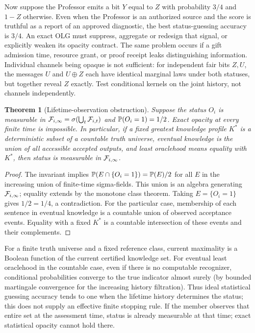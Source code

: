 \documentclass[11pt]{article}
\newtheorem{theorem}{Theorem}[section]\newtheorem{proposition}[theorem]{Proposition}\newtheorem{lemma}[theorem]{Lemma}\newtheorem{corollary}[theorem]{Corollary}
\theoremstyle{definition}\newtheorem{definition}[theorem]{Definition}\newtheorem{conjecture}[theorem]{Conjecture}\newtheorem{example}[theorem]{Example}
\begin{document}
Now suppose the Professor emits a bit $Y$ equal to $Z$ with probability $3/4$ and $1-Z$ otherwise. Even when the Professor is an authorized source and the score is truthful as a report of an approved diagnostic, the best status-guessing accuracy is $3/4$. An exact OLG must suppress, aggregate or redesign that signal, or explicitly weaken its opacity contract. The same problem occurs if a gift admission time, resource grant, or proof receipt leaks distinguishing information. Individual channels being opaque is not sufficient: for independent fair bits $Z,U$, the messages $U$ and $U\oplus Z$ each have identical marginal laws under both statuses, but together reveal $Z$ exactly. Test conditional kernels on the joint history, not channels independently.

\begin{theorem}[Lifetime-observation obstruction]
Suppose the status $O_i$ is measurable in $\mathcal F_{i,\infty}=\sigma(\bigcup_t\mathcal F_{i,t})$ and $\mathbb P(O_i=1)=1/2$. Exact opacity at every finite time is impossible. In particular, if a fixed greatest knowledge profile $K^*$ is a deterministic subset of a countable truth universe, eventual knowledge is the union of all accessible accepted outputs, and least oraclehood means equality with $K^*$, then status is measurable in $\mathcal F_{i,\infty}$.
\end{theorem}
\begin{proof}The invariant implies $\mathbb P(E\cap\{O_i=1\})=\mathbb P(E)/2$ for all $E$ in the increasing union of finite-time sigma-fields. This union is an algebra generating $\mathcal F_{i,\infty}$; equality extends by the monotone class theorem. Taking $E=\{O_i=1\}$ gives $1/2=1/4$, a contradiction. For the particular case, membership of each sentence in eventual knowledge is a countable union of observed acceptance events. Equality with a fixed $K^*$ is a countable intersection of these events and their complements.\end{proof}
For a finite truth universe and a fixed reference class, current maximality is a Boolean function of the current certified knowledge set. For eventual least oraclehood in the countable case, even if there is no computable recognizer, conditional probabilities converge to the true indicator almost surely (by bounded martingale convergence for the increasing history filtration). Thus ideal statistical guessing accuracy tends to one when the lifetime history determines the status; this does not supply an effective finite stopping rule. If the member observes that entire set at the assessment time, status is already measurable at that time; exact statistical opacity cannot hold there.
\end{document}
